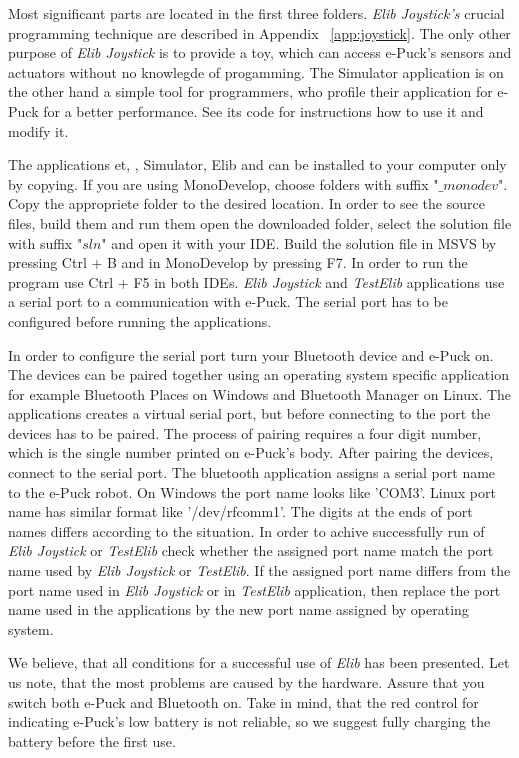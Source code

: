   Most significant parts are located in the first three folders.
  {\it Elib Joystick's} crucial programming technique are described in Appendix ~\ref{app:joystick}.
  The only other purpose of {\it Elib Joystick} is to provide a toy, which can access e-Puck's sensors and actuators without no knowlegde of progamming.
  The Simulator application is on the other hand a simple tool for programmers, who profile their application for e-Puck for a better performance.
  See its code for instructions how to use it and modify it.

  The applications {\sf et}, {}, {\sf Simulator}, {\sf Elib} and {}
  can be installed to your computer only by copying.
  If you are using MonoDevelop, choose folders with suffix "$\_monodev$". 
  Copy the appropriete folder to the desired location.
  In order to see the source files, build them and run them open the downloaded folder, select the solution file with suffix "$sln$" and open it with your IDE.
  Build the solution file in MSVS by pressing Ctrl + B and in MonoDevelop by pressing F7. 
  In order to run the program use Ctrl + F5 in both IDEs.
  {\it Elib Joystick} and {\it TestElib} applications use a serial port to a communication with e-Puck. 
  The serial port has to be configured before running the applications.

  In order to configure the serial port turn your Bluetooth device and e-Puck on. 
  The devices can be paired together using an operating system specific application 
  for example Bluetooth Places on Windows and Bluetooth Manager on Linux. 
  The applications creates a virtual serial port, but before connecting to the port
  the devices has to be paired.
  The process of pairing requires a four digit number, 
  which is the single number printed on e-Puck's body.
  After pairing the devices, connect to the serial port.
  The bluetooth application assigns a serial port name to the e-Puck robot. 
  On Windows the port name looks like 'COM3'. 
  Linux port name has similar format like '/dev/rfcomm1'.
  The digits at the ends of port names differs according to the situation.
  In order to achive successfully run of {\it Elib Joystick} or {\it TestElib} check
  whether the assigned port name match the port name used by {\it Elib Joystick} or {\it TestElib}.
  If the assigned port name differs from the port name used in {\it Elib Joystick}
  or in {\it TestElib} application, then replace the port name used in the applications by
  the new port name assigned by operating system.

  We believe, that all conditions for a successful use  of {\it Elib} has been presented. 
  Let us note, that the most problems are caused by the hardware.
  Assure that you switch both e-Puck and Bluetooth on. Take in mind, 
  that the red control for indicating e-Puck's low battery is not reliable,
  so we suggest fully charging the battery before the first use.

